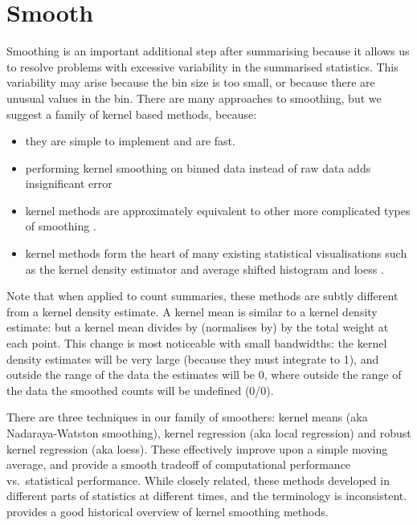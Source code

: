 \documentclass[journal]{vgtc}                %
\begin{document}
\section{Smooth}
\label{sec:smooth}

Smoothing is an important additional step after summarising because it allows us to resolve problems with excessive variability in the summarised statistics. This variability may arise because the bin size is too small, or because there are unusual values in the bin. There are many approaches to smoothing, but we suggest a family of kernel based methods, because:

\begin{itemize}
  \item they are simple to implement and are fast.
  
  \item performing kernel smoothing on binned data instead of raw data adds insignificant error \cite{wand:1994} 
  
  \item kernel methods are approximately equivalent to other more complicated types of smoothing \citep{silverman:1984}.
  
  \item kernel methods form the heart of many existing statistical visualisations such as the kernel density estimator \citep{scott:1992} and average shifted histogram \citep{scott:1985} and loess \citep{cleveland:1979}.

\end{itemize}

Note that when applied to count summaries, these methods are subtly different from a kernel density estimate. A kernel mean is similar to a kernel density estimate: but a kernel mean divides by (normalises by) by the total weight at each point. This change is most noticeable with small bandwidths: the kernel density estimates will be very large (because they must integrate to 1), and outside the range of the data the estimates will be 0, where outside the range of the data the smoothed counts will be undefined (0/0).

There are three techniques in our family of smoothers: kernel means (aka Nadaraya-Watston smoothing), kernel regression (aka local regression) and robust kernel regression (aka loess). These effectively improve upon a simple moving average, and provide a smooth tradeoff of computational performance vs.\ statistical performance. While closely related, these methods developed in different parts of statistics at different times, and the terminology is inconsistent. \citep{cleveland:1996} provides a good historical overview of kernel smoothing methods.
\end{document}
